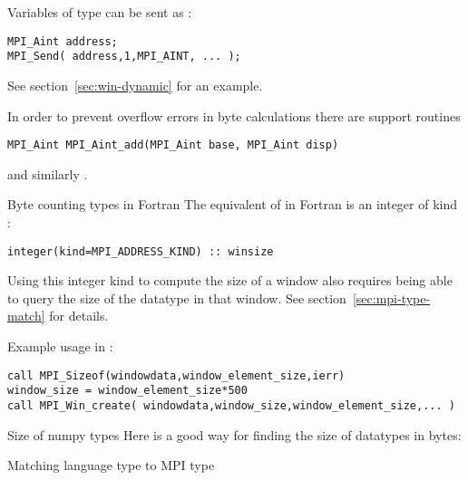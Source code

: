 Variables of type  can be sent as :
\begin{lstlisting}
MPI_Aint address;
MPI_Send( address,1,MPI_AINT, ... );
\end{lstlisting}
See section~\ref{sec:win-dynamic} for an example.

In order to prevent overflow errors in byte calculations
there are support routines 
\begin{lstlisting}
MPI_Aint MPI_Aint_add(MPI_Aint base, MPI_Aint disp)
\end{lstlisting}
and similarly .

\begin{fortrannote}{Byte counting types in Fortran}
The equivalent of
 in Fortran
is an integer of kind :
\lstset{style=reviewcode,language=Fortran} %
\begin{lstlisting}
integer(kind=MPI_ADDRESS_KIND) :: winsize
\end{lstlisting}
\lstset{style=reviewcode,language=C} %

Using this integer kind to compute the size of a window
also requires being able to query the size of the datatype
in that window.
See section~\ref{sec:mpi-type-match} for details.

Example usage in :
\lstset{language=Fortran} %
\begin{lstlisting}
call MPI_Sizeof(windowdata,window_element_size,ierr)
window_size = window_element_size*500
call MPI_Win_create( windowdata,window_size,window_element_size,... )
\end{lstlisting}
\lstset{language=C} %
\end{fortrannote}

\begin{pythonnote}{Size of numpy types}
  Here is a good way for finding the size of  datatypes
  in bytes:
\end{pythonnote}

 {Matching language type to MPI type}
\label{sec:mpi-type-match}


